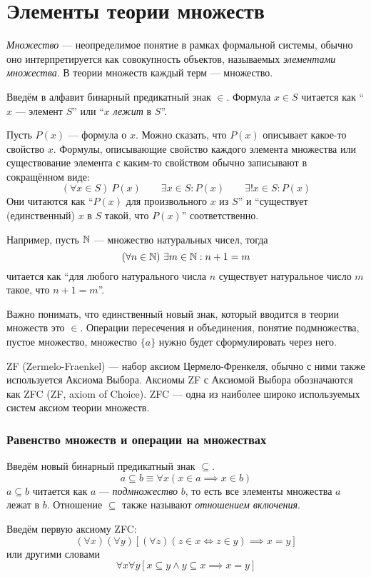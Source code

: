 \part{Элементы теории множеств}

{\it Множество} --- неопределимое понятие в рамках формальной системы,
обычно оно интерпретируется как совокупность объектов,
называемых {\it элементами множества}.
В теории множеств каждый терм --- множество.

Введём в алфавит бинарный предикатный знак $\in$. Формула ${x\in S}$ читается
как ``$x$ --- элемент $S$'' или ``$x$ {\it лежит} в $S$''.

Пусть $P(x)$ --- формула о $x$. Можно сказать, что $P(x)$ описывает какое-то
свойство $x$.
Формулы, описывающие свойство каждого элемента множества или
существование элемента с каким-то свойством обычно записывают в сокращённом виде:
\[
	(\forall x\in S)~P(x)\qquad
	\exists x\in S:P(x)\qquad \exists!x\in S:P(x)
\]
Они читаются как ``$P(x)$ для произвольного $x$ из $S$'' и
``существует (единственный) $x$ в $S$ такой, что $P(x)$'' соответственно.

Например, пусть $\mathbb N$ --- множество натуральных чисел, тогда
\[
	(\forall n\in\mathbb N)~\exists m\in\mathbb N:n+1=m
\]
читается как ``для любого натурального числа $n$ существует натуральное число
$m$ такое, что $n+1=m$''.

Важно понимать, что единственный новый знак, который вводится в теории множеств
это $\in$. Операции пересечения и объединения, понятие подмножества, пустое множество,
множество $\{a\}$ нужно будет сформулировать через него.

ZF (Zermelo-Fraenkel) --- набор аксиом Цермело-Френкеля, обычно с ними также
используется Аксиома Выбора. Аксиомы ZF с Аксиомой Выбора
обозначаются как ZFC (ZF, axiom of Choice).
ZFC --- одна из наиболее широко используемых систем аксиом теории множеств.

\section{Равенство множеств и операции на множествах}

Введём новый бинарный предикатный знак $\subseteq$.
\[
	a\subseteq b\equiv \forall x(x\in a\implies x\in b)
\]
${a\subseteq b}$ читается как $a$ --- {\it подмножество} $b$, то есть все
элементы множества $a$ лежат в $b$. Отношение $\subseteq$ также называют
{\it отношением включения}.

Введём первую аксиому ZFC:
\[
	(\forall x)(\forall y)[(\forall z)(z\in x\iff z\in y)\implies x=y]
\]
или другими словами
\[
	\forall x\forall y[x\subseteq y\land y\subseteq x\implies x=y]
\]

